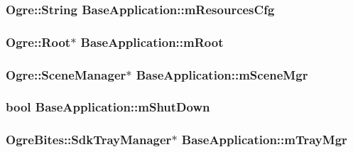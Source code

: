 \hypertarget{class_base_application_a765e0df01c141a16df3178ab4f17afe6}{
\subsubsection[{m\-Resources\-Cfg}]{\setlength{\rightskip}{0pt plus 5cm}Ogre\-::\-String Base\-Application\-::m\-Resources\-Cfg\hspace{0.3cm}{\ttfamily [protected]}}}\label{class_base_application_a765e0df01c141a16df3178ab4f17afe6}
\hypertarget{class_base_application_add84ba707dc6c57e6283f214b1274110}{
\subsubsection[{m\-Root}]{\setlength{\rightskip}{0pt plus 5cm}Ogre\-::\-Root$\ast$ Base\-Application\-::m\-Root\hspace{0.3cm}{\ttfamily [protected]}}}\label{class_base_application_add84ba707dc6c57e6283f214b1274110}
\hypertarget{class_base_application_a8a7684f4f9a57ed3089048ad1a913b2d}{
\subsubsection[{m\-Scene\-Mgr}]{\setlength{\rightskip}{0pt plus 5cm}Ogre\-::\-Scene\-Manager$\ast$ Base\-Application\-::m\-Scene\-Mgr\hspace{0.3cm}{\ttfamily [protected]}}}\label{class_base_application_a8a7684f4f9a57ed3089048ad1a913b2d}
\hypertarget{class_base_application_a755f26d3a9915aaf830750d877e39d86}{
\subsubsection[{m\-Shut\-Down}]{\setlength{\rightskip}{0pt plus 5cm}bool Base\-Application\-::m\-Shut\-Down\hspace{0.3cm}{\ttfamily [protected]}}}\label{class_base_application_a755f26d3a9915aaf830750d877e39d86}
\hypertarget{class_base_application_a7faa397f4f4861ee8c361a01e90b4416}{
\subsubsection[{m\-Tray\-Mgr}]{\setlength{\rightskip}{0pt plus 5cm}Ogre\-Bites\-::\-Sdk\-Tray\-Manager$\ast$ Base\-Application\-::m\-Tray\-Mgr\hspace{0.3cm}{\ttfamily [protected]}}}\label{class_base_application_a7faa397f4f4861ee8c361a01e90b4416}

